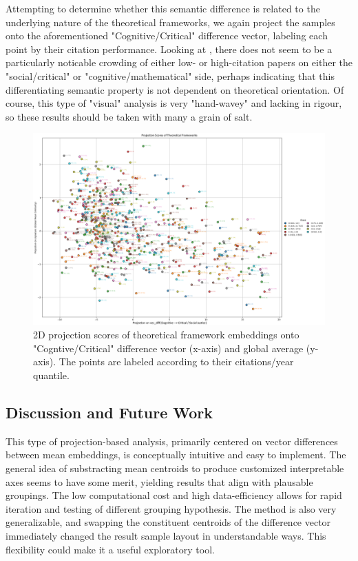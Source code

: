 Attempting to determine whether this semantic difference is related to the underlying nature of the theoretical frameworks, we again project the samples onto the aforementioned "Cognitive/Critical" difference vector, labeling each point by their citation performance. Looking at , there does not seem to be a particularly noticable crowding of either low- or high-citation papers on either the "social/critical" or "cognitive/mathematical" side, perhaps indicating that this differentiating semantic property is not dependent on theoretical orientation. Of course, this type of "visual" analysis is very "hand-wavey" and lacking in rigour, so these results should be taken with many a grain of salt.
\begin{figure}
    \centering
    \includegraphics[width=1\linewidth]{media/cogn_crit_proj_citations.png}
    \caption{2D projection scores of theoretical framework embeddings onto "Cogntive/Critical" difference vector (x-axis) and global average (y-axis). The points are labeled according to their citations/year quantile.}
    \label{fig:114}
\end{figure}

\subsection{Discussion and Future Work}

This type of projection-based analysis, primarily centered on vector differences between mean embeddings, is conceptually intuitive and easy to implement. The general idea of substracting mean centroids to produce customized interpretable axes seems to have some merit, yielding results that align with plausable groupings. The low computational cost and high data-efficiency allows for rapid iteration and testing of different grouping hypothesis. The method is also very generalizable, and swapping the constituent centroids of the difference vector immediately changed the result sample layout in understandable ways. This flexibility could make it a useful exploratory tool.

